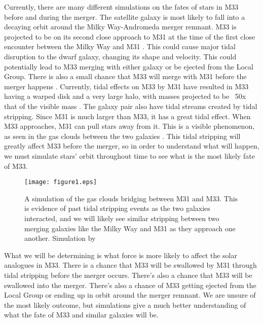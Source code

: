 \documentclass{aastex63}
\begin{document}
Currently, there are many different simulations on the fates of stars in M33 before and during the merger. The satellite galaxy is most likely to fall into a decaying orbit around the Milky Way-Andromeda merger remnant. M33 is projected to be on its second close approach to M31 at the time of the first close encounter between the Milky Way and M31 \citep{VDM2012}. This could cause major tidal disruption to the dwarf galaxy, changing its shape and velocity. This could potentially lead to M33 merging with either galaxy or be ejected from the Local Group. There is also a small chance that M33 will merge with M31 before the merger happens \citep{VDM2012}. Currently, tidal effects on M33 by M31 have resulted in M33 having a warped disk and a very large halo, with masses projected to be ~50x that of the visible mass \citep{Corbel03}. The galaxy pair also have tidal streams created by tidal stripping. Since M31 is much larger than M33, it has a great tidal effect. When M33 approaches, M31 can pull stars away from it. This is a visible phenomenon, as seen in the gas clouds between the two galaxies \cite{TG20}. This tidal stripping will greatly affect M33 before the merger, so in order to understand what will happen, we must simulate stars' orbit throughout time to see what is the most likely fate of M33. 

\begin{figure}[ht!]
\texttt{[image: figure1.eps]}
\caption{A simulation of the gas clouds bridging between M31 and M33. This is evidence of past tidal stripping events as the two galaxies interacted, and we will likely see similar stripping between two merging galaxies like the Milky Way and M31 as they approach one another. Simulation by \cite{TG20}}
\end{figure}

What we will be determining is what force is more likely to affect the solar analogues in M33. There is a chance that M33 will be swallowed by M31 through tidal stripping before the merger occurs. There's also a chance that M33 will be swallowed into the merger. There's also a chance of M33 getting ejected from the Local Group or ending up in orbit around the merger remnant. We are unsure of the most likely outcome, but simulations give a much better understanding of what the fate of M33 and similar galaxies will be.
\end{document}
